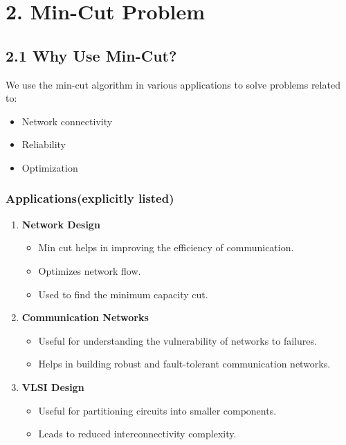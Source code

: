 \documentclass[12pt]{article}
\begin{document}
\section*{2. Min-Cut Problem}

\subsection*{2.1 Why Use Min-Cut?}

We use the min-cut algorithm in various applications to solve problems related to:

\begin{itemize}
\item Network connectivity
\item Reliability
\item Optimization
\end{itemize}

\subsubsection*{Applications(explicitly listed)}

\begin{enumerate}
\item \textbf{Network Design}
\begin{itemize}
\item Min cut helps in improving the efficiency of communication.
\item Optimizes network flow.
\item Used to find the minimum capacity cut.
\end{itemize}

\item \textbf{Communication Networks}
\begin{itemize}
\item Useful for understanding the vulnerability of networks to failures.
\item Helps in building robust and fault-tolerant communication networks.
\end{itemize}

\item \textbf{VLSI Design}
\begin{itemize}
\item Useful for partitioning circuits into smaller components.
\item Leads to reduced interconnectivity complexity.
\end{itemize}
\end{enumerate}
\end{document}
